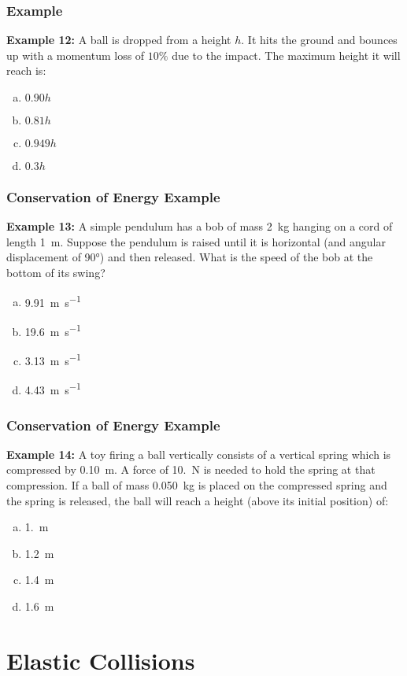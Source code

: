 \documentclass[12pt,compress,aspectratio=169]{beamer}
\begin{document}
\begin{frame}
  \frametitle{Example}
  \textbf{Example 12:} A ball is dropped from a height $h$. It hits the ground
  and bounces up with a momentum loss of $10\%$ due to the impact. The maximum
  height it will reach is:
  \begin{enumerate}[(a)]
  \item $0.90h$
  \item $0.81h$
  \item $0.949h$
  \item $0.3h$
  \end{enumerate}
\end{frame}

\begin{frame}
  \frametitle{Conservation of Energy Example}
  \textbf{Example 13:} A simple pendulum has a bob of mass \SI{2}{\kilo\gram}
  hanging on a cord of length \SI{1}{\metre}. Suppose the pendulum is raised
  until it is horizontal (and angular displacement of \ang{90}) and then
  released. What is the speed of the bob at the bottom of its swing?
  \begin{enumerate}[(a)]
  \item\SI{9.91}{\metre\per\second}
  \item\SI{19.6}{\metre\per\second}
  \item\SI{3.13}{\metre\per\second}
  \item\SI{4.43}{\metre\per\second}
  \end{enumerate}
\end{frame}
 
\begin{frame}
  \frametitle{Conservation of Energy Example}
  \textbf{Example 14:} A toy firing a ball vertically consists of a vertical
  spring which is compressed by \SI{.10}{\metre}. A force of \SI{10.}{\newton}
  is needed to hold the spring at that compression. If a ball of mass
  \SI{.050}{\kilo\gram} is placed on the compressed spring and the spring is
  released, the ball will reach a height (above its initial position) of:
  \begin{enumerate}[(a)]
  \item \SI{1.}{\metre}
  \item \SI{1.2}{\metre}
  \item \SI{1.4}{\metre}
  \item \SI{1.6}{\metre}
  \end{enumerate}
\end{frame}


\section{Elastic Collisions}
\end{document}
